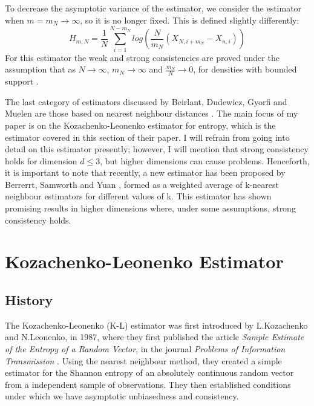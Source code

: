\documentclass[12pt]{report}
\begin{document}
To decrease the asymptotic variance of the estimator, we consider the estimator when $m = m_{N} \to \infty$, so it is no longer fixed. This is defined slightly differently:
\begin{equation}
H_{m, N} = \frac{1}{N} \sum_{i=1}^{N-m_{N}} log \left(\frac{N}{m_{N}} (X_{N, i+m_{N}} - X_{n, i}) \right)
\end{equation}
For this estimator the weak and strong consistencies are proved under the assumption that as $N \to \infty$, $m_{N} \to \infty$ and $\frac{m_{N}}{N} \to 0$, for densities with bounded support \cite{paper10}.

The last category of estimators discussed by Beirlant, Dudewicz, Gyorfi and Muelen are those based on nearest neighbour distances \cite{paper10}. The main focus of my paper is on the Kozachenko-Leonenko estimator for entropy, which is the estimator covered in this section of their paper. I will refrain from going into detail on this estimator presently; however, I will mention that strong consistency holds for dimension $d \leq 3$, but higher dimensions can cause problems. Henceforth, it is important to note that recently, a new estimator has been proposed by Berrerrt, Samworth and Yuan \cite{paper4}, formed as a weighted average of k-nearest neighbour estimators for different values of k. This estimator has shown promising results in higher dimensions where, under some assumptions, strong consistency holds.






\chapter{Kozachenko-Leonenko Estimator}

\section{History} \label{history}

The Kozachenko-Leonenko (K-L) estimator was first introduced by L.Kozachenko and N.Leonenko, in 1987, where they first published the article \textit{Sample Estimate of the Entropy of a Random Vector}, in the journal \textit{Problems of Information Transmission} \cite{paper1}. Using the nearest neighbour method, they created a simple estimator for the Shannon entropy of an absolutely continuous random vector from a independent sample of observations. They then established conditions under which we have asymptotic unbiasedness and consistency.
\end{document}
